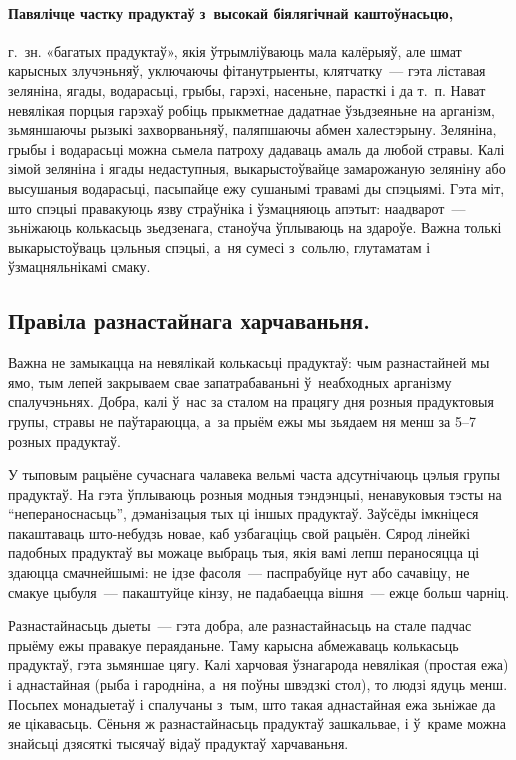 \paragraph{Павялічце частку прадуктаў з~высокай біялягічнай каштоўнасьцю,} г.~зн. «багатых прадуктаў», якія ўтрымліўваюць мала калёрыяў, але шмат карысных злучэньняў, уключаючы фітанутрыенты, клятчатку~--- гэта ліставая зеляніна, ягады, водарасьці, грыбы, гарэхі, насеньне, парасткі і да т.~п. Нават невялікая порцыя гарэхаў робіць прыкметнае дадатнае ўзьдзеяньне на арганізм, зьмяншаючы рызыкі захворваньняў, паляпшаючы абмен халестэрыну. Зеляніна, грыбы і водарасьці можна сьмела патроху дадаваць амаль да любой стравы. Калі зімой зеляніна і ягады недаступныя, выкарыстоўвайце замарожаную зеляніну або высушаныя водарасьці, пасыпайце ежу сушанымі травамі ды спэцыямі. Гэта міт, што спэцыі правакуюць язву страўніка і ўзмацняюць апэтыт: наадварот~--- зьніжаюць колькасьць зьедзенага, станоўча ўплываюць на здароўе. Важна толькі выкарыстоўваць цэльныя спэцыі, а~ня сумесі з~сольлю, глутаматам і ўзмацняльнікамі смаку.

\subsection*{Правіла разнастайнага харчаваньня.}
Важна не замыкацца на невялікай колькасьці прадуктаў: чым разнастайней мы ямо, тым лепей закрываем свае запатрабаваньні ў~неабходных арганізму спалучэньнях. Добра, калі ў~нас за сталом на працягу дня розныя прадуктовыя групы, стравы не паўтараюцца, а~за прыём ежы мы зьядаем ня менш за 5--7 розных прадуктаў.

У тыповым рацыёне сучаснага чалавека вельмі часта адсутнічаюць цэлыя групы прадуктаў. На гэта ўплываюць розныя модныя тэндэнцыі, ненавуковыя тэсты на ``непераноснасьць'', дэманізацыя тых ці іншых прадуктаў. Заўсёды імкніцеся пакаштаваць што-небудзь новае, каб узбагаціць свой рацыён. Сярод лінейкі падобных прадуктаў вы можаце выбраць тыя, якія вамі лепш пераносяцца ці здаюцца смачнейшымі: не ідзе фасоля~--- паспрабуйце нут або сачавіцу, не смакуе цыбуля~--- пакаштуйце кінзу, не падабаецца вішня~--- ежце больш чарніц.

Разнастайнасьць дыеты~--- гэта добра, але разнастайнасьць на стале падчас прыёму ежы правакуе пераяданьне. Таму карысна абмежаваць колькасьць прадуктаў, гэта зьмяншае цягу. Калі харчовая ўзнагарода невялікая (простая ежа) і аднастайная (рыба і гародніна, а~ня поўны швэдзкі стол), то людзі ядуць менш. Посьпех монадыетаў і спалучаны з~тым, што такая аднастайная ежа зьніжае да яе цікавасьць. Сёньня ж разнастайнасьць прадуктаў зашкальвае, і ў~краме можна знайсьці дзясяткі тысячаў відаў прадуктаў харчаваньня. 

